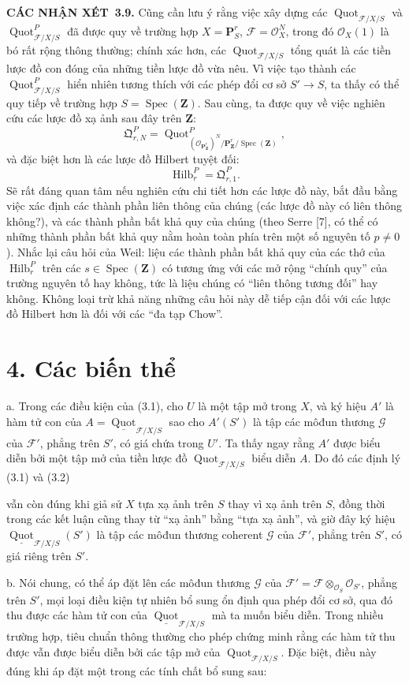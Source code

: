 \documentclass[11pt,twoside,openany]{book}
\numberwithin{equation}{section}
\newcommand{\src}[1]{%
  \phantomsection\hypertarget{src:\fgasourceid:#1}{}%
  \marginpar{\raggedleft\footnotesize\sffamily #1}%
}
\newcommand{\fgasourceid}{unset}
\newcommand{\fsection}[2]{%
  \section*{#1. #2}%
  \addcontentsline{toc}{section}{#1. #2}%
}
\newcommand{\result}[2]{\par\medskip\noindent\textbf{#1\if\relax\detokenize{#2}\relax\else\ #2\fi.}\quad}
\begin{document}
\result{CÁC NHẬN XÉT}{3.9} Cũng cần lưu ý rằng việc xây dựng các
$\operatorname{Quot}_{\mathcal F/X/S}$ và
$\operatorname{Quot}^P_{\mathcal F/X/S}$ đã được quy về trường hợp
$X=\mathbf P^r_S$, $\mathcal F=\mathcal O_X^N$, trong đó
$\mathcal O_X(1)$ là bó rất rộng thông thường; chính xác hơn, các
$\operatorname{Quot}_{\mathcal F/X/S}$ tổng quát là các tiền lược đồ con đóng
của những tiền lược đồ vừa nêu. Vì việc tạo thành các
$\operatorname{Quot}^P_{\mathcal F/X/S}$ hiển nhiên tương thích với các phép
đổi cơ sở $S'\longrightarrow S$, ta thấy có thể quy tiếp về trường hợp
$S=\operatorname{Spec}(\mathbf Z)$. Sau cùng, ta được quy về việc nghiên
cứu các lược đồ xạ ảnh sau đây trên $\mathbf Z$:
\[
\mathfrak Q^P_{r,N}=
\operatorname{Quot}^{P}_{(\mathcal O_{\mathbf P^r_{\mathbf Z}})^N/
\mathbf P^r_{\mathbf Z}/\operatorname{Spec}(\mathbf Z)},
\]
và đặc biệt hơn là các lược đồ Hilbert tuyệt đối:
\[
\operatorname{Hilb}^P_r=\mathfrak Q^P_{r,1}.
\]
Sẽ rất đáng quan tâm nếu nghiên cứu chi tiết hơn các lược đồ này, bắt đầu bằng
việc xác định các thành phần liên thông của chúng (các lược đồ này có liên
thông không?), và các thành phần bất khả quy của
chúng (theo Serre [7], có thể có những thành phần bất khả quy nằm hoàn toàn
phía trên một số nguyên tố $p\neq0$). Nhắc lại câu hỏi của Weil: liệu các thành
phần bất khả quy của các thớ của $\operatorname{Hilb}^P_r$ trên các
$s\in\operatorname{Spec}(\mathbf Z)$ có tương ứng với các mở rộng
``chính quy'' của trường nguyên tố hay không, tức là liệu chúng có ``liên thông
tương đối'' hay không. Không loại trừ khả năng những câu hỏi này dễ tiếp cận
đối với các lược đồ Hilbert hơn là đối với các ``đa tạp Chow''.

\fsection{4}{Các biến thể}

\noindent a. Trong các điều kiện của (3.1), cho $U$ là một tập mở trong $X$,
và ký hiệu $A'$ là hàm tử con của
$A=\underline{\operatorname{Quot}}_{\mathcal F/X/S}$ sao cho $A'(S')$ là tập
các môđun thương $\mathcal G$ của $\mathcal F'$, phẳng trên $S'$, có giá chứa
trong $U'$. Ta thấy ngay rằng $A'$ được biểu diễn bởi một tập mở của tiền lược
đồ $\operatorname{Quot}_{\mathcal F/X/S}$ biểu diễn $A$. Do đó các định lý
(3.1) và (3.2)
\src{267}
vẫn còn đúng khi giả sử $X$ tựa xạ ảnh trên $S$ thay vì xạ ảnh trên $S$, đồng
thời trong các kết luận cũng thay từ ``xạ ảnh'' bằng ``tựa xạ ảnh'', và giờ
đây ký hiệu
$\underline{\operatorname{Quot}}_{\mathcal F/X/S}(S')$ là tập các môđun
thương coherent $\mathcal G$ của $\mathcal F'$, phẳng trên $S'$, có giá riêng
trên $S'$.

\medskip
\noindent b. Nói chung, có thể áp đặt lên các môđun thương $\mathcal G$ của
$\mathcal F'=\mathcal F\otimes_{\mathcal O_S}\mathcal O_{S'}$, phẳng trên
$S'$, mọi loại điều kiện tự nhiên bổ sung ổn định qua phép đổi cơ sở, qua đó thu
được các hàm tử con của
$\underline{\operatorname{Quot}}_{\mathcal F/X/S}$ mà ta muốn biểu diễn. Trong
nhiều trường hợp, tiêu chuẩn thông thường cho phép chứng minh rằng các hàm tử
thu được vẫn được biểu diễn bởi các tập mở của
$\operatorname{Quot}_{\mathcal F/X/S}$. Đặc biệt, điều này đúng khi áp đặt một
trong các tính chất bổ sung sau:
\end{document}
